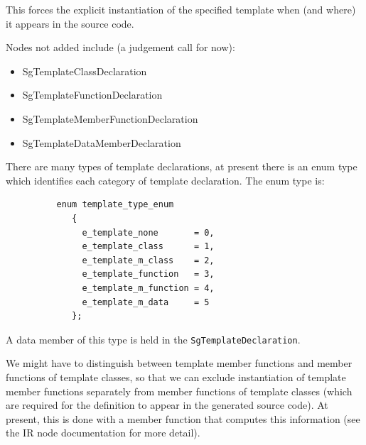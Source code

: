 \begin{itemize}
           This forces the explicit instantiation of the specified template when (and
           where) it appears in the source code.
\end{itemize}

Nodes not added include (a judgement call for now):
\begin{itemize}
     \item SgTemplateClassDeclaration
     \item SgTemplateFunctionDeclaration
     \item SgTemplateMemberFunctionDeclaration
     \item SgTemplateDataMemberDeclaration
\end{itemize}
There are many types of template declarations, at present there is an enum type
which identifies each category of template declaration.  The enum type is:

{\indent
{\mySmallFontSize

\begin{verbatim}
          enum template_type_enum 
             {
               e_template_none       = 0,
               e_template_class      = 1,
               e_template_m_class    = 2,
               e_template_function   = 3,
               e_template_m_function = 4,
               e_template_m_data     = 5
             };
\end{verbatim}
}}

A data member of this type is held in the {\tt SgTemplateDeclaration}.


   We might have to distinguish between template member functions and member functions
   of template classes, so that we can exclude instantiation of template member functions
   separately from member functions of template classes (which are required for the
   definition to appear in the generated source code).  At present, this is done with a
   member function that computes this information (see the IR node documentation for more detail).

